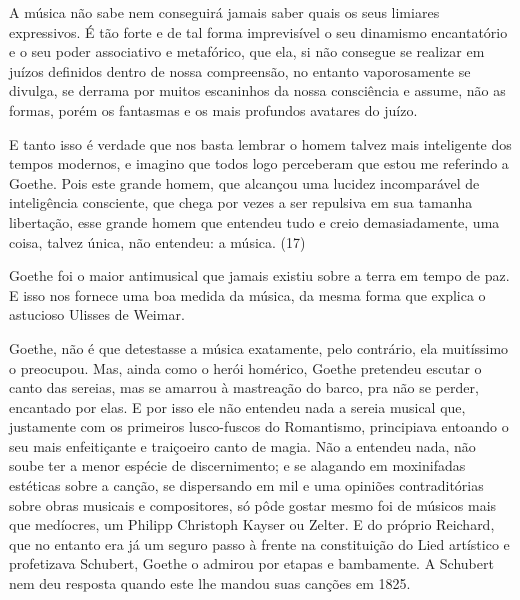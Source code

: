 A música não sabe nem conseguirá jamais saber quais os seus limiares
expressivos. É tão forte e de tal forma imprevisível o seu dinamismo
encantatório e o seu poder associativo e metafórico, que ela, si não
consegue se realizar em juízos definidos dentro de nossa compreensão, no
entanto vaporosamente se divulga, se derrama por muitos escaninhos da
nossa consciência e assume, não as formas, porém os fantasmas e os mais
profundos avatares do juízo.

E tanto isso é verdade que nos basta lembrar o homem talvez mais
inteligente dos tempos modernos, e imagino que todos logo perceberam que
estou me referindo a Goethe. Pois este grande homem, que alcançou uma
lucidez incomparável de inteligência consciente, que chega por vezes a
ser repulsiva em sua tamanha libertação, esse grande homem que entendeu
tudo e creio demasiadamente, uma coisa, talvez única, não entendeu: a
música. (17)

Goethe foi o maior antimusical que jamais existiu sobre a terra em tempo
de paz. E isso nos fornece uma boa medida da música, da mesma forma que
explica o astucioso Ulisses de Weimar.

Goethe, não é que detestasse a música exatamente, pelo contrário, ela
muitíssimo o preocupou. Mas, ainda como o herói homérico, Goethe
pretendeu escutar o canto das sereias, mas se amarrou à mastreação do
barco, pra não se perder, encantado por elas. E por isso ele não
entendeu nada a sereia musical que, justamente com os primeiros
lusco-fuscos do Romantismo, principiava entoando o seu mais enfeitiçante
e traiçoeiro canto de magia. Não a entendeu nada, não soube ter a menor
espécie de discernimento; e se alagando em moxinifadas estéticas sobre a
canção, se dispersando em mil e uma opiniões contraditórias sobre obras
musicais e compositores, só pôde gostar mesmo foi de músicos mais que
medíocres, um Philipp Christoph Kayser ou Zelter. E do próprio Reichard,
que no entanto era já um seguro passo à frente na constituição do Lied
artístico e profetizava Schubert, Goethe o admirou por etapas e
bambamente. A Schubert nem deu resposta quando este lhe mandou suas
canções em 1825.

